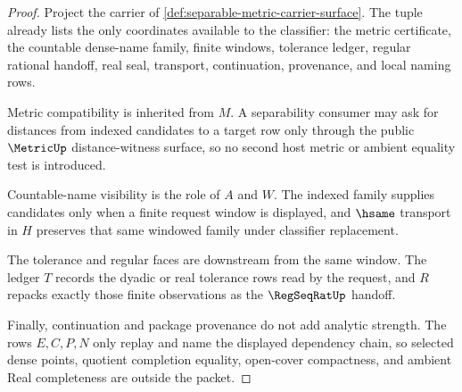 \begin{proof}
Project the carrier of \autoref{def:separable-metric-carrier-surface}. The tuple already lists the only coordinates available to the classifier: the metric certificate, the countable dense-name family, finite windows, tolerance ledger, regular rational handoff, real seal, transport, continuation, provenance, and local naming rows.

Metric compatibility is inherited from $M$. A separability consumer may ask for distances from indexed candidates to a target row only through the public $\MetricUp$ distance-witness surface, so no second host metric or ambient equality test is introduced.

Countable-name visibility is the role of $A$ and $W$. The indexed family supplies candidates only when a finite request window is displayed, and $\hsame$ transport in $H$ preserves that same windowed family under classifier replacement.

The tolerance and regular faces are downstream from the same window. The ledger $T$ records the dyadic or real tolerance rows read by the request, and $R$ repacks exactly those finite observations as the $\RegSeqRatUp$ handoff.

Finally, continuation and package provenance do not add analytic strength. The rows $E,C,P,N$ only replay and name the displayed dependency chain, so selected dense points, quotient completion equality, open-cover compactness, and ambient Real completeness are outside the packet.
\end{proof}

